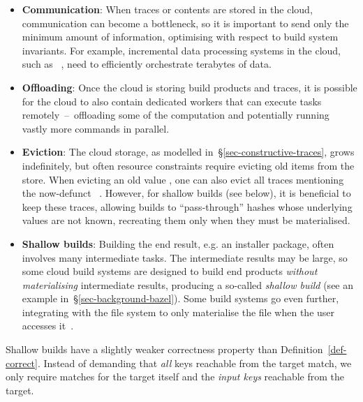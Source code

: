 \begin{itemize}
\item \textbf{Communication}: When traces or contents are stored in the cloud,
communication can become a bottleneck, so it is important to send only the
minimum amount of information, optimising with respect to build system
invariants. For example, incremental data processing systems in the cloud, such
as \Reflow~\cite{reflow}, need to efficiently orchestrate terabytes of data.

\item \textbf{Offloading}: Once the cloud is storing build products and traces,
it is possible for the cloud to also contain dedicated workers that can execute
tasks remotely~--~offloading some of the computation and potentially running
vastly more commands in parallel.

\item \textbf{Eviction}: The cloud storage, as modelled
in~\S\ref{sec-constructive-traces}, grows indefinitely, but often resource
constraints require evicting old items from the store. When evicting an old
value , one can also evict all traces mentioning the now-defunct
~. However, for shallow builds (see below), it is beneficial to
keep these traces, allowing builds to ``pass-through'' hashes whose underlying
values are not known, recreating them only when they must be materialised.

\item \textbf{Shallow builds}: Building the end result, e.g. an installer
package, often involves many intermediate tasks. The intermediate results may be
large, so some cloud build systems are designed to build end products
\emph{without materialising} intermediate results, producing a so-called
\emph{shallow build} (see an example in~\S\ref{sec-background-bazel}). Some
build systems go even further, integrating with the file system to only
materialise the file when the user accesses it~\cite{gvfs}.
\end{itemize}

Shallow builds have a slightly weaker correctness property than
Definition~\ref{def-correct}. Instead of demanding that \emph{all} keys reachable
from the target match, we only require matches for the target itself and the \emph{input
keys} reachable from the target.

